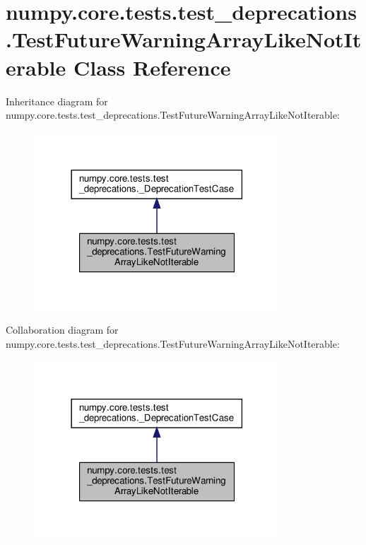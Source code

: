 \hypertarget{classnumpy_1_1core_1_1tests_1_1test__deprecations_1_1TestFutureWarningArrayLikeNotIterable}{}\section{numpy.\+core.\+tests.\+test\+\_\+deprecations.\+Test\+Future\+Warning\+Array\+Like\+Not\+Iterable Class Reference}
\label{classnumpy_1_1core_1_1tests_1_1test__deprecations_1_1TestFutureWarningArrayLikeNotIterable}


Inheritance diagram for numpy.\+core.\+tests.\+test\+\_\+deprecations.\+Test\+Future\+Warning\+Array\+Like\+Not\+Iterable\+:
\nopagebreak
\begin{figure}[H]
\begin{center}
\leavevmode
\includegraphics[width=261pt]{classnumpy_1_1core_1_1tests_1_1test__deprecations_1_1TestFutureWarningArrayLikeNotIterable__inherit__graph}
\end{center}
\end{figure}


Collaboration diagram for numpy.\+core.\+tests.\+test\+\_\+deprecations.\+Test\+Future\+Warning\+Array\+Like\+Not\+Iterable\+:
\nopagebreak
\begin{figure}[H]
\begin{center}
\leavevmode
\includegraphics[width=261pt]{classnumpy_1_1core_1_1tests_1_1test__deprecations_1_1TestFutureWarningArrayLikeNotIterable__coll__graph}
\end{center}
\end{figure}
